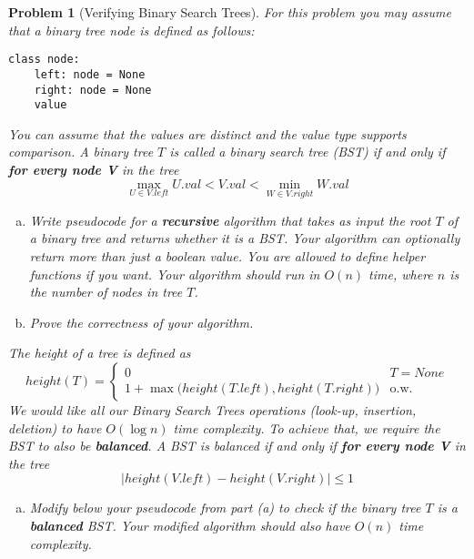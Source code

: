 \documentclass[10pt]{article}
\newtheorem{problem}{\sc\color{cit}Problem}
\begin{document}


\begin{problem}[Verifying Binary Search Trees]
For this problem you may assume that a binary tree node is defined as follows:

\begin{verbatim}
class node:
    left: node = None
    right: node = None
    value
\end{verbatim}
You can assume that the values are distinct and the value type supports comparison.
A binary tree $T$ is called a binary search tree (BST) if and only if \textbf{for every node V} in the tree
\[\max_{U \in V.left} U.val < V.val < \min_{W \in V.right} W.val\]

\begin{enumerate}[(a)]
    \item Write pseudocode for a \textbf{recursive} algorithm that takes as input the root $T$ of a binary tree and returns whether it is a BST. Your algorithm can optionally return more than just a boolean value. You are allowed to define helper functions if you want. Your algorithm should run in $O(n)$ time, where $n$ is the number of nodes in tree $T$.

    \item Prove the correctness of your algorithm.
\end{enumerate}
The height of a tree is defined as 
\[height(T) = \begin{cases} 0 & T = None \\
1 + \max\big(height(T.left), height(T.right)\big) & \text{o.w.}\end{cases}\]
We would like all our Binary Search Trees operations (look-up, insertion, deletion) to have $O(\log n)$ time complexity. To achieve that, we require the BST to also be \textbf{balanced}.
A BST is balanced if and only if \textbf{for every node V} in the tree
\[\big|height(V.left) - height(V.right)\big| \leq 1\]

\begin{enumerate}[(a),resume]
    \item Modify below your pseudocode from part (a) to check if the binary tree $T$ is a \textbf{balanced} BST. Your modified algorithm should also have $O(n)$ time complexity.
\end{enumerate}
\end{problem}
\end{document}
